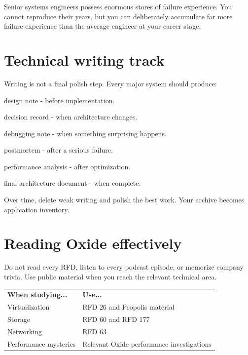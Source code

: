 \documentclass[11pt,letterpaper]{article}
\begin{document}
Senior systems engineers possess enormous stores of failure experience. You cannot reproduce their years, but you can deliberately accumulate far more failure experience than the average engineer at your career stage.

\section{Technical writing track}\label{sec:22}

Writing is not a final polish step. Every major system should produce:

\begin{topics}

\item design note - before implementation.

\item decision record - when architecture changes.

\item debugging note - when something surprising happens.

\item postmortem - after a serious failure.

\item performance analysis - after optimization.

\item final architecture document - when complete.

\end{topics}

Over time, delete weak writing and polish the best work. Your archive becomes application inventory.

\section{Reading Oxide effectively}\label{sec:23}

Do not read every RFD, listen to every podcast episode, or memorize company trivia. Use public material when you reach the relevant technical area.

\begin{center}
\small
\begin{tabular}{>{\raggedright\arraybackslash}p{}>{\raggedright\arraybackslash}p{}}
\textbf{When studying...} & \textbf{Use...} \\
Virtualization & RFD 26 and Propolis material \\
Storage & RFD 60 and RFD 177 \\
Networking & RFD 63 \\
Performance mysteries & Relevant Oxide performance investigations \\
\end{tabular}
\end{center}
\end{document}
